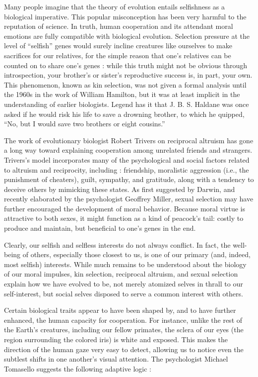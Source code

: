 \documentclass[a4paper,14pt]{extbook}
\begin{document}
Many people imagine that the theory of evolution entails selfishness as a biological imperative.
This popular misconception has been very harmful to the reputation of science.
In truth, human cooperation and its attendant moral emotions are fully compatible with biological evolution.
Selection pressure at the level of ``selfish'' genes would surely incline creatures like ourselves to make sacrifices for our relatives, for the simple reason that one's relatives can be counted on to share one's genes :
while this truth might not be obvious through introspection, your brother's or sister's reproductive success is, in part, your own.
This phenomenon, known as kin selection, was not given a formal analysis until the 1960s in the work of William Hamilton, but it was at least implicit in the understanding of earlier biologists.
Legend has it that J. B. S. Haldane was once asked if he would risk his life to save a drowning brother, to which he quipped, ``No, but I would save two brothers or eight cousins.''

The work of evolutionary biologist Robert Trivers on reciprocal altruism has gone a long way toward explaining cooperation among unrelated friends and strangers.
Trivers's model incorporates many of the psychological and social factors related to altruism and reciprocity, including :
friendship, moralistic aggression (i.e., the punishment of cheaters), guilt, sympathy, and gratitude, along with a tendency to deceive others by mimicking these states.
As first suggested by Darwin, and recently elaborated by the psychologist Geoffrey Miller, sexual selection may have further encouraged the development of moral behavior.
Because moral virtue is attractive to both sexes, it might function as a kind of peacock's tail:
costly to produce and maintain, but beneficial to one's genes in the end.

Clearly, our selfish and selfless interests do not always conflict.
In fact, the well-being of others, especially those closest to us, is one of our primary (and, indeed, most selfish) interests.
While much remains to be understood about the biology of our moral impulses, kin selection, reciprocal altruism, and sexual selection explain how we have evolved to be, not merely atomized selves in thrall to our self-interest, but social selves disposed to serve a common interest with others.

Certain biological traits appear to have been shaped by, and to have further enhanced, the human capacity for cooperation.
For instance, unlike the rest of the Earth's creatures, including our fellow primates, the sclera of our eyes (the region surrounding the colored iris) is white and exposed.
This makes the direction of the human gaze very easy to detect, allowing us to notice even the subtlest shifts in one another's visual attention.
The psychologist Michael Tomasello suggests the following adaptive logic :
\end{document}
